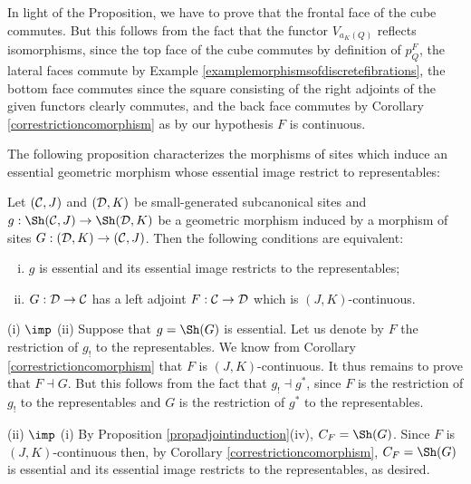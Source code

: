 \documentclass[a4paper,12pt]{article}
\begin{document}
\begin{proofs}
	In light of the Proposition, we have to prove that the frontal face of the cube commutes. But this follows from the fact that the functor $V_{a_{K}(Q)}$ reflects isomorphisms, since the top face of the cube commutes by definition of $p^{F}_{Q}$, the lateral faces commute by Example \ref{examplemorphismsofdiscretefibrations}, the bottom face commutes since the square consisting of the right adjoints of the given functors clearly commutes, and the back face commutes by Corollary \ref{correstrictioncomorphism} as by our hypothesis $F$ is continuous.
\end{proofs}


The following proposition characterizes the morphisms of sites which induce an essential geometric morphism whose essential image restrict to representables:

\begin{proposition}
	Let $({\cal C},J)$ and $({\cal D}, K)$ be small-generated subcanonical sites and $g:\Sh({\cal C},J) \to \Sh({\cal D}, K)$ be a geometric morphism induced by a morphism of sites $G:({\cal D}, K) \to ({\cal C},J)$. Then the following conditions are equivalent:
	\begin{enumerate}[(i)]
		\item $g$ is essential and its essential image restricts to the representables; 
		
		\item $G:{\cal D}\to {\cal C}$ has a left adjoint $F:{\cal C}\to {\cal D}$ which is $(J, K)$-continuous. 
	\end{enumerate} 
\end{proposition}

\begin{proofs}
	(i) $\imp$ (ii) Suppose that $g=\Sh(G)$ is essential. Let us denote by $F$ the restriction of $g_{!}$ to the representables. We know from Corollary \ref{correstrictioncomorphism} that $F$ is $(J, K)$-continuous.  It thus remains to prove that $F\dashv G$. But this follows from the fact that $g_{!}\dashv g^{\ast}$, since $F$ is the restriction of $g_{!}$ to the representables and $G$ is the restriction of $g^{\ast}$ to the representables.
	
	(ii) $\imp$ (i) By Proposition \ref{propadjointinduction}(iv), $C_{F}= \Sh(G)$. Since $F$ is $(J, K)$-continuous then, by Corollary \ref{correstrictioncomorphism}, $C_{F}=\Sh(G)$ is essential and its essential image restricts to the representables, as desired. 
\end{proofs}
\end{document}
